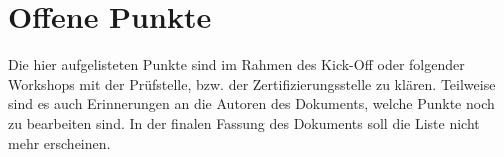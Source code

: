 \chapter*{Offene Punkte}
\label{appendix.todo}

Die hier aufgelisteten Punkte sind im Rahmen des Kick-Off oder folgender
Workshops mit der Prüfstelle, bzw. der Zertifizierungsstelle zu
klären. Teilweise sind es auch Erinnerungen an die Autoren des Dokuments, welche
Punkte noch zu bearbeiten sind. In der finalen Fassung des Dokuments soll die
Liste nicht mehr erscheinen.


